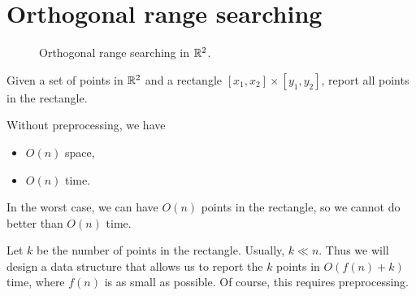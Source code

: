 \chapter{Orthogonal range searching} \label{chp:ors}

\begin{figure}[h]
    \centering
    \caption{Orthogonal range searching in $\mathbb{R}^2$.}
    \label{fig:ors}
\end{figure}

\begin{question*}
    Given a set of points in $\mathbb{R}^2$ and a rectangle
    $[x_1, x_2] \times [y_1, y_2]$, report all points in the rectangle.
\end{question*}

Without preprocessing, we have
\begin{itemize}
    \item $O(n)$ space,
    \item $O(n)$ time.
\end{itemize}

In the worst case, we can have $O(n)$ points in the rectangle,
so we cannot do better than $O(n)$ time.

Let $k$ be the number of points in the rectangle.
Usually, $k \ll n$.
Thus we will design a data structure that allows us to report
the $k$ points in $O(f(n) + k)$ time, where $f(n)$ is as small as possible.
Of course, this requires preprocessing.

